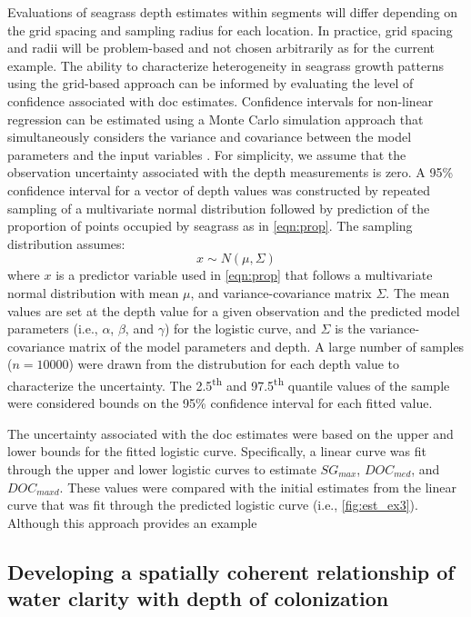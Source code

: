 \documentclass[letterpaper,12pt,oneside]{article}\usepackage[]{graphicx}\usepackage[]{color}
\begin{document}
Evaluations of seagrass depth estimates within segments will differ depending on the grid spacing and sampling radius for each location.  In practice, grid spacing and radii will be problem-based and not chosen arbitrarily as for the current example.  The ability to characterize heterogeneity in seagrass growth patterns using the grid-based approach can be informed by evaluating the level of confidence associated with \ac{doc} estimates.  Confidence intervals for non-linear regression can be estimated using a Monte Carlo simulation approach that simultaneously considers the variance and covariance between the model parameters and the input variables \citep{Hilborn97}.  For simplicity, we assume that the observation uncertainty associated with the depth measurements is zero.  A 95\% confidence interval for a vector of depth values was constructed by repeated sampling of a multivariate normal distribution followed by prediction of the proportion of points occupied by seagrass as in \cref{eqn:prop}.  The sampling distribution assumes:
\begin{equation}
x \sim N(\mu, \Sigma)
\end{equation}
\noindent where $x$ is a predictor variable used in \cref{eqn:prop} that follows a multivariate normal distribution with mean $\mu$, and variance-covariance matrix $\Sigma$.  The mean values are set at the depth value for a given observation and the predicted model parameters (i.e., $\alpha$, $\beta$, and $\gamma$) for the logistic curve, and $\Sigma$ is the variance-covariance matrix of the model parameters and depth.  A large number of samples ($n = 10000$) were drawn from the distrubution for each depth value to characterize the uncertainty.  The 2.5\textsuperscript{th} and 97.5\textsuperscript{th} quantile values of the sample were considered bounds on the 95\% confidence interval for each fitted value.

The uncertainty associated with the \ac{doc} estimates were based on the upper and lower bounds for the fitted logistic curve.  Specifically, a linear curve was fit through the upper and lower logistic curves to estimate $SG_{max}$, $DOC_{med}$, and $DOC_{maxd}$.  These values were  compared with the initial estimates from the linear curve that was fit through the predicted logistic curve (i.e., \cref{fig:est_ex3}).  Although this approach provides an example 



\subsection{Developing a spatially coherent relationship of water clarity with depth of colonization}
\end{document}
